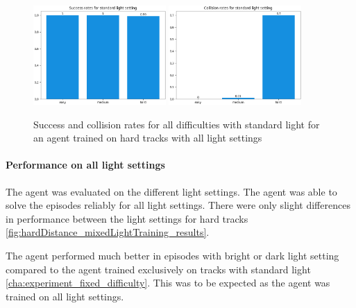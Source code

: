 \begin{figure}
    \centering
    \includegraphics[width=0.45\textwidth]{Bilder/notebook_images/hardDistanceMixedLight_eval_standard_success_rates_barplot.png}
    \includegraphics[width=0.45\textwidth]{Bilder/notebook_images/hardDistanceMixedLight_eval_standard_collision_rates_barplot.png}
    \caption{Success and collision rates for all difficulties with standard light for an agent trained on hard tracks with all light settings}
    \label{fig:hardDistance_mixedLight_generalization}
\end{figure}

\paragraph{Performance on all light settings}

The agent was evaluated on the different light settings. The agent was able to solve the episodes reliably for all light settings. There were only slight differences in performance between the light settings for hard tracks \ref{fig:hardDistance_mixedLightTraining_results}.


The agent performed much better in episodes with bright or dark light setting compared to the agent trained exclusively on tracks with standard light \ref{cha:experiment_fixed_difficulty}. This was to be expected as the agent was trained on all light settings.

